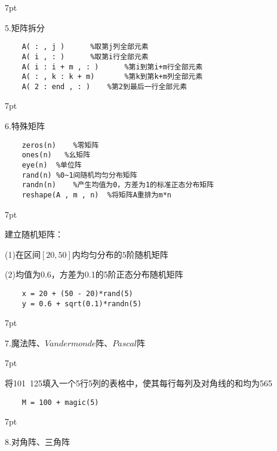 \documentclass{article} %
\newenvironment{eg}{%
\def\FrameCommand{%
\hspace{1pt}%
{\color{Gray}\vrule width 2pt}%
{\color{egshade}\vrule width 4pt}%
\colorbox{egshade}%
}%
\MakeFramed{\advance\hsize-\width\FrameRestore}%
\noindent\hspace{-4.55pt}%
\begin{adjustwidth}{}{7pt}%
\vspace{2pt}\vspace{2pt}%
\normalfont %
}
{%
\vspace{2pt}\end{adjustwidth}\endMakeFramed%
}
\newenvironment{wa}{%
\def\FrameCommand{%
\hspace{1pt}%
{\color{LightCoral}\vrule width 2pt}%
{\color{washade}\vrule width 4pt}%
\colorbox{washade}%
}%
\MakeFramed{\advance\hsize-\width\FrameRestore}%
\noindent\hspace{-4.55pt}%
\begin{adjustwidth}{}{7pt}%
\vspace{2pt}\vspace{2pt}%
\normalfont %
}
{%
\vspace{2pt}\end{adjustwidth}\endMakeFramed%
}
\begin{document}
\begin{eg}
    5.矩阵拆分
\end{eg}
\begin{lstlisting}
    A( : , j )      %取第j列全部元素
    A( i , : )      %取第i行全部元素
    A( i : i + m , : )      %第i到第i+m行全部元素
    A( : , k : k + m)       %第k到第k+m列全部元素
    A( 2 : end , : )    %第2到最后一行全部元素
\end{lstlisting}

\begin{eg}
    6.特殊矩阵
\end{eg}
\begin{lstlisting}
    zeros(n)    %零矩阵
    ones(n)   %幺矩阵
    eye(n)  %单位阵
    rand(n) %0~1间随机均匀分布矩阵
    randn(n)    %产生均值为0，方差为1的标准正态分布矩阵
    reshape(A , m , n)  %将矩阵A重排为m*n
\end{lstlisting}

\begin{wa}
    建立随机矩阵：
    
    (1)在区间$[20,50]$内均匀分布的$5$阶随机矩阵
    
    (2)均值为0.6，方差为0.1的5阶正态分布随机矩阵
\end{wa}
\begin{lstlisting}
    x = 20 + (50 - 20)*rand(5)
    y = 0.6 + sqrt(0.1)*randn(5)
\end{lstlisting}

\begin{eg}
    7.魔法阵、$Vandermonde$阵、$Pascal$阵
\end{eg}

\begin{wa}
    将101~125填入一个5行5列的表格中，使其每行每列及对角线的和均为565
\end{wa}
\begin{lstlisting}
    M = 100 + magic(5)
\end{lstlisting}

\begin{eg}
    8.对角阵、三角阵
\end{eg}
\end{document}
